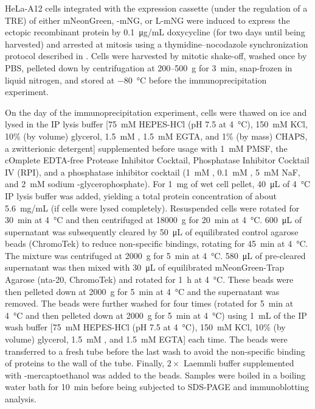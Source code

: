 HeLa-A12 cells integrated with the expression cassette (under the regulation of a TRE) of either mNeonGreen, -mNG, or \textDelta{}L-mNG were induced to express the ectopic recombinant protein by \SI{0.1}{\micro g/ mL} doxycycline (for two days until being harvested) and arrested at mitosis using a thymidine--nocodazole synchronization protocol described in . Cells were harvested by mitotic shake-off, washed once by PBS, pelleted down by centrifugation at 200--\SI{500}{g} for \SI{3}{min}, snap-frozen in liquid nitrogen, and stored at \SI{-80}{\celsius} before the immunoprecipitation experiment.

On the day of the immunoprecipitation experiment, cells were thawed on ice and lysed in the IP lysis buffer [\SI{75}{mM} HEPES-HCl (pH 7.5 at \SI{4}{\celsius}), \SI{150}{mM} KCl, 10\% (by volume) glycerol, \SI{1.5}{mM} , \SI{1.5}{mM} EGTA, and 1\% (by mass) CHAPS, a zwitterionic detergent] supplemented before usage with \SI{1}{mM} PMSF, the cOmplete\texttrademark{} EDTA-free Protease Inhibitor Cocktail, Phosphatase Inhibitor Cocktail IV (RPI), and a phosphatase inhibitor cocktail (\SI{1}{mM} , \SI{0.1}{mM} , \SI{5}{mM} NaF, and \SI{2}{mM} sodium \textbeta-glycerophosphate). For \SI{1}{mg} of wet cell pellet, \SI{40}{\micro L} of \SI{4}{\celsius} IP lysis buffer was added, yielding a total protein concentration of about \SI{5.6}{mg/mL} (if cells were lysed completely). Resuspended cells were rotated for \SI{30}{min} at \SI{4}{\celsius} and then centrifuged at \SI{18000}{g} for \SI{20}{min} at \SI{4}{\celsius}. \SI{600}{\micro L} of supernatant was subsequently cleared by \SI{50}{\micro L} of equilibrated control agarose beads (ChromoTek) to reduce non-specific bindings, rotating for \SI{45}{min} at \SI{4}{\celsius}. The mixture was centrifuged at \SI{2000}{g} for \SI{5}{min} at \SI{4}{\celsius}. \SI{580}{\micro L} of pre-cleared supernatant was then mixed with \SI{30}{\micro L} of equilibrated mNeonGreen-Trap Agarose (nta-20, ChromoTek) and rotated for \SI{1}{h} at \SI{4}{\celsius}. These beads were then pelleted down at \SI{2000}{g} for \SI{5}{min} at \SI{4}{\celsius} and the supernatant was removed. The beads were further washed for four times (rotated for \SI{5}{min} at \SI{4}{\celsius} and then pelleted down at \SI{2000}{g} for \SI{5}{min} at \SI{4}{\celsius}) using \SI{1}{mL} of the IP wash buffer [\SI{75}{mM} HEPES-HCl (pH 7.5 at \SI{4}{\celsius}), \SI{150}{mM} KCl, 10\% (by volume) glycerol, \SI{1.5}{mM} , and \SI{1.5}{mM} EGTA] each time. The beads were transferred to a fresh tube before the last wash to avoid the non-specific binding of proteins to the wall of the tube. Finally, $2\times$ Laemmli buffer supplemented with \textbeta-mercaptoethanol was added to the beads. Samples were boiled in a boiling water bath for \SI{10}{min} before being subjected to SDS-PAGE and immunoblotting analysis.

